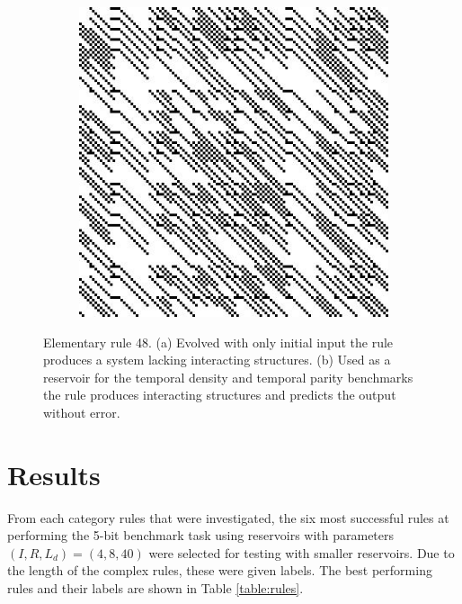 \documentclass{elsarticle}
\begin{document}
\begin{multicols}{2}
\begin{figure}[H]
\begin{subfigure}[]{0.475\linewidth}
		\caption{}
	\end{subfigure}
	\begin{subfigure}[]{0.475\linewidth}
		\includegraphics[width=\linewidth]{rule48_reservoir.jpg}
		\caption{}
	\end{subfigure}
	\caption{Elementary rule 48. (a) Evolved with only initial input the rule 
		produces a system lacking interacting structures. (b) Used as a reservoir 
		for the temporal density and temporal parity benchmarks the rule 
		produces interacting structures and predicts the output without 
	error.}
	\label{rule48}
	\end{figure}
	
	\section{Results}\label{results}
	From each category rules that were investigated, the six most successful rules 
	at performing the 5-bit benchmark task using reservoirs with parameters 
	$(I, R, L_{d}) = (4, 8, 40)$ were selected for testing with smaller  
	reservoirs. Due to the length of the complex rules, these were given 
	labels.  The best performing rules and their labels are shown in Table
	\ref{table:rules}. 
	

\end{multicols}
\end{document}
